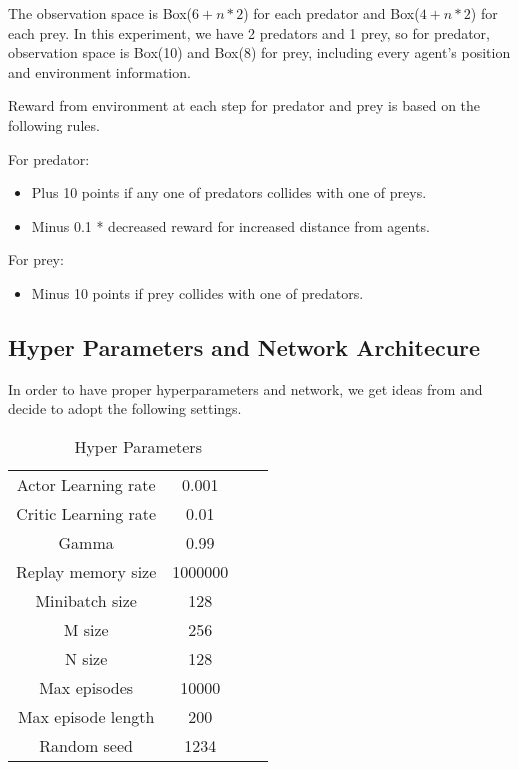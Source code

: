 \documentclass[11pt,twocolumn]{jarticle} %
\begin{document}
The observation space is Box($6+n*2$) for each predator and Box($4+n*2$) for each prey. In this experiment, we have 2 predators and 1 prey, so for predator, observation space is Box(10) and Box(8) for prey, including every agent's position and environment information. \par
Reward from environment at each step for predator and prey is based on the following rules. \par
For predator:
\begin{itemize}
  \item Plus 10 points if any one of predators collides with one of preys.
  \item Minus 0.1 * decreased reward for increased distance from agents.
\end{itemize}
For prey:
\begin{itemize}
  \item Minus 10 points if prey collides with one of predators.
\end{itemize}

\subsection{Hyper Parameters and Network Architecure}
In order to have proper hyperparameters and network, we get ideas from \cite{param} and decide to adopt the following settings.

\begin{table}[ht]
 \caption{Hyper Parameters} 
 \label{tbl:hyperparameters}
  \begin{center}
    \begin{tabular}{c|ccc}
  \hline \hline
  Actor Learning rate  & 0.001   \\
  Critic Learning rate & 0.01    \\
  Gamma                & 0.99    \\
  Replay memory size   & 1000000 \\
  Minibatch size       & 128     \\
  M size               & 256     \\
  N size               & 128     \\
  Max episodes         & 10000   \\
  Max episode length   & 200     \\
  Random seed          & 1234    \\\hline
    \end{tabular}
  \end{center}
\end{table}
\end{document}
